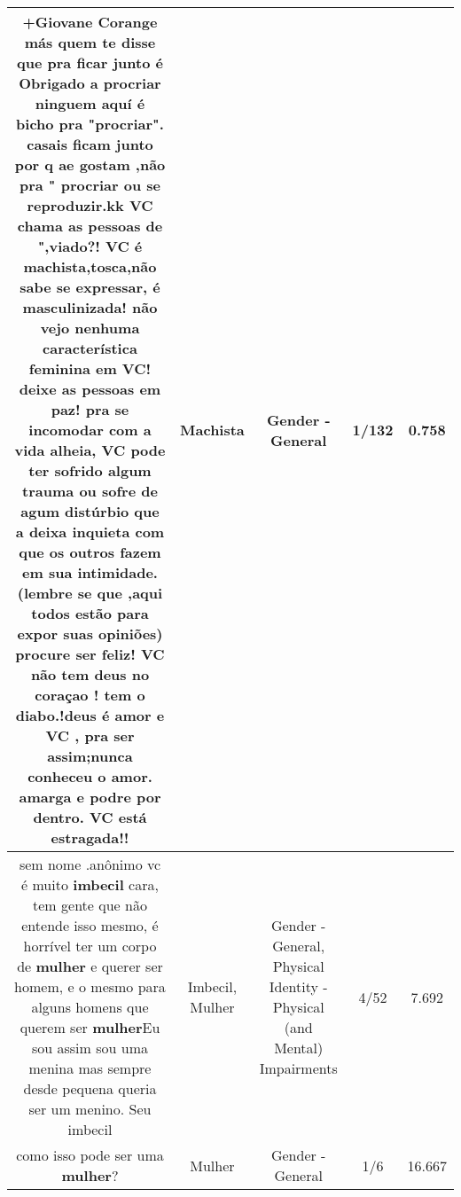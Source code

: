 \documentclass[11pt]{article}
\newlength\mylength
\begin{document}
\begin{center}
\begin{longtable}{|C{.65\mylength}|C{.30\mylength}|C{.12\mylength}|C{.12\mylength}|C{.12\mylength}|}
  \small +Giovane Corange más quem te disse que pra ficar junto é Obrigado a procriar ninguem aquí é bicho pra "procriar". casais ficam junto por q ae gostam ,não pra " procriar ou se reproduzir.kk VC chama as pessoas de ",viado?! VC é \textbf{machista},tosca,não sabe se expressar, é masculinizada! não vejo nenhuma característica feminina em VC! deixe as pessoas em paz! pra se incomodar com a vida alheia, VC pode ter sofrido algum trauma ou sofre de agum distúrbio que a deixa inquieta com que os outros fazem em sua intimidade. (lembre se que ,aqui todos estão para expor suas opiniões) procure ser feliz! VC não tem deus no coraçao ! tem o diabo.!deus é amor e VC , pra ser assim;nunca conheceu o amor.  amarga e podre por dentro. VC está estragada!!\normalsize   & Machista & Gender - General & 1/132 & 0.758 \\  \hline
  \small sem nome .anônimo vc é muito \textbf{imbecil} cara, tem gente que não entende isso mesmo, é horrível ter um corpo de \textbf{mulher} e querer ser homem, e o mesmo para alguns homens que querem ser \textbf{mulher}Eu sou assim  sou uma menina mas sempre desde pequena queria ser um menino. Seu imbecil\normalsize   & Imbecil, Mulher & Gender - General, Physical Identity - Physical (and Mental) Impairments & 4/52 & 7.692 \\  \hline
  \small como isso pode ser uma \textbf{mulher}?\normalsize   & Mulher & Gender - General & 1/6 & 16.667 \\  \hline
  
\end{longtable}
\end{center}
\end{document}
